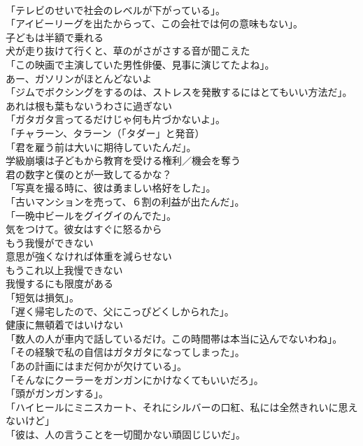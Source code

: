 \documentclass[8pt]{extreport}
\begin{document}
\begin{CJK}{UTF8}{min}
\\	「テレビのせいで社会のレベルが下がっている」。	
\\	「アイビーリーグを出たからって、この会社では何の意味もない」。	
\\	子どもは半額で乗れる	
\\	犬が走り抜けて行くと、草のがさがさする音が聞こえた	
\\	「この映画で主演していた男性俳優、見事に演じてたよね」。	
\\	あー、ガソリンがほとんどないよ	
\\	「ジムでボクシングをするのは、ストレスを発散するにはとてもいい方法だ」。	
\\	あれは根も葉もないうわさに過ぎない	
\\	「ガタガタ言ってるだけじゃ何も片づかないよ」。	
\\	「チャラーン、タラーン（「タダー」と発音）	
\\	「君を雇う前は大いに期待していたんだ」。	
\\	学級崩壊は子どもから教育を受ける権利／機会を奪う	
\\	君の数字と僕のとが一致してるかな？	
\\	「写真を撮る時に、彼は勇ましい格好をした」。	
\\	「古いマンションを売って、６割の利益が出たんだ」。	
\\	「一晩中ビールをグイグイのんでた」。	
\\	気をつけて。彼女はすぐに怒るから	
\\	もう我慢ができない	
\\	意思が強くなければ体重を減らせない	
\\	もうこれ以上我慢できない	
\\	我慢するにも限度がある	
\\	「短気は損気」。	
\\	「遅く帰宅したので、父にこっぴどくしかられた」。	
\\	健康に無頓着ではいけない	
\\	「数人の人が車内で話しているだけ。この時間帯は本当に込んでないわね」。	
\\	「その経験で私の自信はガタガタになってしまった」。	
\\	「あの計画にはまだ何かが欠けている」。	
\\	「そんなにクーラーをガンガンにかけなくてもいいだろ」。	
\\	「頭がガンガンする」。	
\\	「ハイヒールにミニスカート、それにシルバーの口紅、私には全然きれいに思えないけど」	
\\	「彼は、人の言うことを一切聞かない頑固じじいだ」。	

\end{CJK}
\end{document}
